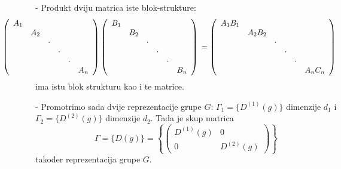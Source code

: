 - Produkt dviju matrica iste blok-strukture:
\begin{displaymath}
\!\!\!\!\!\!\!\!\!\!\!\!\!\!\!\!\!\!\!\!\!\!\!\!\!   \left(
   \begin{array}{cccccc}
        A_1 & & & & & \\
        & A_2 & & & &  \\
        & & \cdot & & & \\
        & & &  \cdot  & & \\
        & & & &  \cdot   & \\
        & & & &  & A_n  \\
\end{array}
   \right)
   \left(
   \begin{array}{cccccc}
        B_1 & & & & & \\
        & B_2 & & & &  \\
        & & \cdot & & & \\
        & & &  \cdot  & & \\
        & & & &  \cdot   & \\
        & & & &  & B_n  \\
\end{array}
   \right)  \\
   =\left(
   \begin{array}{cccccc}
        A_1 B_1 & & & & & \\
        & A_2 B_2 & & & &  \\
        & & \cdot & & & \\
        & & &  \cdot  & & \\
        & & & &  \cdot   & \\
        & & & &  & A_n C_n  \\
\end{array}
   \right)
\end{displaymath}
ima istu blok strukturu kao i te matrice.

- Promotrimo sada dvije reprezentacije grupe $G$: $\Gamma_{1}=\{D^{(1)}(g)\}$
  dimenzije $d_1$ i $\Gamma_{2}=\{D^{(2)}(g)\}$ dimenzije $d_2$.
  Tada je skup matrica 
\begin{displaymath}
   \Gamma = \{D(g)\}= \left\{ \left(
   \begin{array}{cc}
     D^{(1)}(g) & 0 \\
       0  & D^{(2)}(g)
\end{array} \right) \right\}
\end{displaymath}
također reprezentacija grupe $G$.

